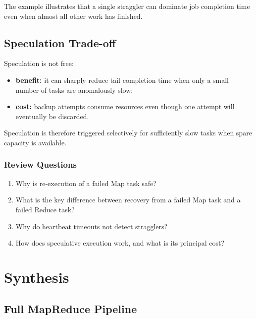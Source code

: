 \documentclass[11pt,a4paper,oneside]{book}
\begin{document}
The example illustrates that a single straggler can dominate job completion time even when almost all other work has finished.

\subsection{Speculation Trade-off}

Speculation is not free:

\begin{itemize}
    \item \textbf{benefit:} it can sharply reduce tail completion time when only a small number of tasks are anomalously slow;
    \item \textbf{cost:} backup attempts consume resources even though one attempt will eventually be discarded.
\end{itemize}

Speculation is therefore triggered selectively for sufficiently slow tasks when spare capacity is available.

\subsubsection*{Review Questions}
\begin{enumerate}
    \item Why is re-execution of a failed Map task safe?
    \item What is the key difference between recovery from a failed Map task and a failed Reduce task?
    \item Why do heartbeat timeouts not detect stragglers?
    \item How does speculative execution work, and what is its principal cost?
\end{enumerate}


\section{Synthesis}

\subsection{Full MapReduce Pipeline}
\end{document}
